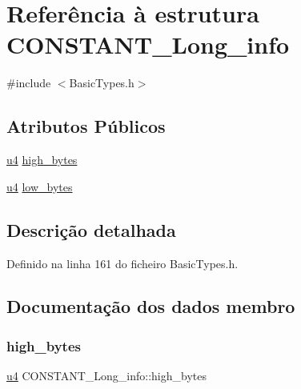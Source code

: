 \hypertarget{structCONSTANT__Long__info}{}\section{Referência à estrutura C\+O\+N\+S\+T\+A\+N\+T\+\_\+\+Long\+\_\+info}
\label{structCONSTANT__Long__info}


{\ttfamily \#include $<$Basic\+Types.\+h$>$}

\subsection*{Atributos Públicos}
\begin{DoxyCompactItemize}
\item 
\hyperlink{BasicTypes_8h_ae5be1f726785414dd1b77d60df074c9d}{u4} \hyperlink{structCONSTANT__Long__info_a66063744fe69754154de824b1d4bcf31}{high\+\_\+bytes}
\item 
\hyperlink{BasicTypes_8h_ae5be1f726785414dd1b77d60df074c9d}{u4} \hyperlink{structCONSTANT__Long__info_aafb2c41b1cf577fab97718cf51e0c00f}{low\+\_\+bytes}
\end{DoxyCompactItemize}


\subsection{Descrição detalhada}


Definido na linha 161 do ficheiro Basic\+Types.\+h.



\subsection{Documentação dos dados membro}
\mbox{\label{structCONSTANT__Long__info_a66063744fe69754154de824b1d4bcf31}} 
\subsubsection{\texorpdfstring{high\+\_\+bytes}{high\_bytes}}
{\footnotesize\ttfamily \hyperlink{BasicTypes_8h_ae5be1f726785414dd1b77d60df074c9d}{u4} C\+O\+N\+S\+T\+A\+N\+T\+\_\+\+Long\+\_\+info\+::high\+\_\+bytes}



